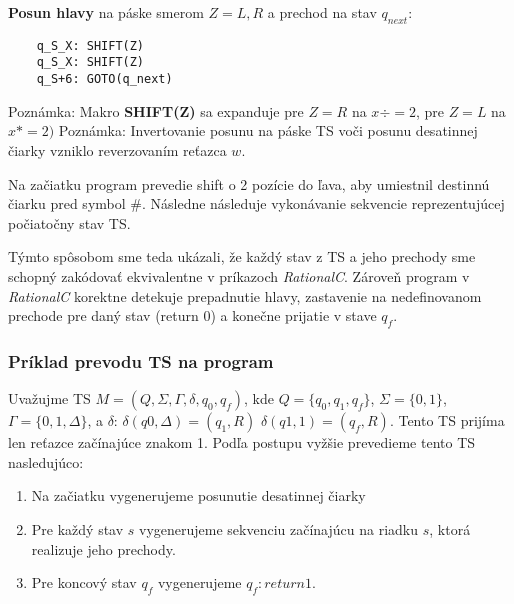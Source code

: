 \documentclass[10pt]{article}
\begin{document}
    \textbf{Posun hlavy} na páske smerom $Z = {L,R}$ a prechod na stav $q_{next}$:
    \begin{verbatim}
    q_S_X: SHIFT(Z) 
    q_S_X: SHIFT(Z)  
    q_S+6: GOTO(q_next) 
    \end{verbatim}
    Poznámka: Makro \textbf{SHIFT(Z)} sa expanduje pre $Z = R$ na $x \div = 2$, pre $Z = L$ na $x *= 2)$ 
    Poznámka: Invertovanie posunu na páske TS voči posunu desatinnej čiarky vzniklo reverzovaním reťazca $w$.

    Na začiatku program prevedie shift o 2 pozície do ľava, aby umiestnil destinnú čiarku pred
    symbol $\#$. Následne následuje vykonávanie sekvencie reprezentujúcej počiatočny stav TS.

    Týmto spôsobom sme teda ukázali, že každý stav z TS a jeho prechody sme schopný zakódovať
    ekvivalentne v príkazoch \textit{RationalC}. 
    Zároveň program v \textit{RationalC} korektne detekuje prepadnutie hlavy, zastavenie na
    nedefinovanom prechode pre daný stav (return 0) a konečne prijatie v stave $q_f$.
    \subsubsection*{Príklad prevodu TS na program}

    Uvažujme TS $M = (Q, \Sigma, \Gamma, \delta, q_0, q_f)$, kde $Q = \{q_0, q_1,q_f\}$, $\Sigma =
    \{0,1\}$, $\Gamma = \{0,1,\Delta\}$, a
    $\delta$: $\delta(q0, \Delta) = (q_1, R)$ $\delta(q1, 1) = (q_f, R)$.
    Tento TS prijíma len reťazce začínajúce znakom 1.
    Podľa postupu vyžšie prevedieme tento TS nasledujúco:
    \begin{enumerate}
        \item Na začiatku vygenerujeme posunutie desatinnej čiarky
        \item Pre každý stav $s$ vygenerujeme sekvenciu začínajúcu na riadku $s$, ktorá realizuje jeho prechody.
        \item Pre koncový stav $q_f$ vygenerujeme $q_f: return 1$.
    \end{enumerate}
\end{document}
